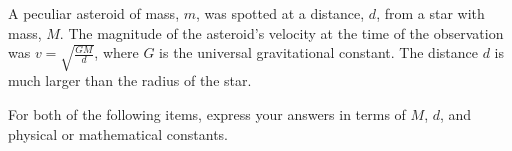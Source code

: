 A peculiar asteroid of mass, $m$, was spotted at a distance, $d$, from a star with mass, $M$. The magnitude of the asteroid's velocity at the time of the observation was $v = \sqrt{\frac{GM}{d}}$, where $G$ is the universal gravitational constant. The distance $d$ is much larger than the radius of the star.

For both of the following items, express your answers in terms of $M$, $d$, and physical or mathematical constants.

